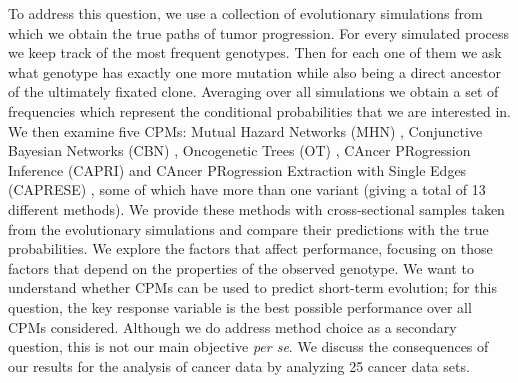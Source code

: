 \documentclass[a4paper,10pt]{article}
\begin{document}
To address this question, we use a collection of evolutionary simulations
from which we obtain the true paths of tumor progression. For every
simulated process we keep track of %
the most frequent genotypes. Then for each one of them we ask what
genotype has exactly one more mutation while also being a direct ancestor
of the ultimately fixated clone. Averaging over all simulations we obtain
a set of frequencies which represent the conditional probabilities that we
are interested in. We then examine five CPMs: Mutual Hazard Networks (MHN)
\cite{schill2020}, Conjunctive Bayesian Networks (CBN)
\cite{Gerstung2009,Gerstung2011,montazeri_large-scale_2016}, Oncogenetic
Trees (OT) \cite{Desper1999JCB,Szabo2008}, CAncer PRogression Inference
(CAPRI) \cite{capri_bioinformatics,capri_pnas} and CAncer PRogression
Extraction with Single Edges (CAPRESE) \cite{caprese_2014}, some of which
have more than one variant (giving a total of 13 different methods). We
provide these methods with cross-sectional samples taken from the
evolutionary simulations and compare their predictions with the true
probabilities. We explore the factors that affect performance, focusing on
those factors that depend on the properties of the observed genotype. We
want to understand whether CPMs can be used to predict short-term
evolution; for this question, the key response variable is the best
possible performance over all CPMs considered. Although we do address
method choice as a secondary question, this is not our main objective 
\textit{per se}. We discuss the consequences of our results for the analysis of
cancer data by analyzing 25 cancer data sets.


\end{document}
